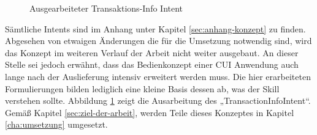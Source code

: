 \begin{figure}[!htb]
    \centering
    \caption{Ausgearbeiteter Transaktions-Info Intent}
    \label{fig:conception-transaction-info}
\end{figure}

Sämtliche Intents sind im Anhang unter Kapitel \ref{sec:anhang-konzept} zu finden. Abgesehen von etwaigen Änderungen die für die Umsetzung notwendig sind, wird das Konzept im weiteren Verlauf der Arbeit nicht weiter ausgebaut. An dieser Stelle sei jedoch erwähnt, dass das Bedienkonzept einer \ac{CUI} Anwendung auch lange nach der Auslieferung intensiv erweitert werden muss. Die hier erarbeiteten Formulierungen bilden lediglich eine kleine Basis dessen ab, was der Skill verstehen sollte. Abbildung \ref{fig:conception-transaction-info} zeigt die Ausarbeitung des „TransactionInfoIntent“. Gemäß Kapitel \ref{sec:ziel-der-arbeit}, werden Teile dieses Konzeptes in Kapitel \ref{cha:umsetzung} umgesetzt.\\

